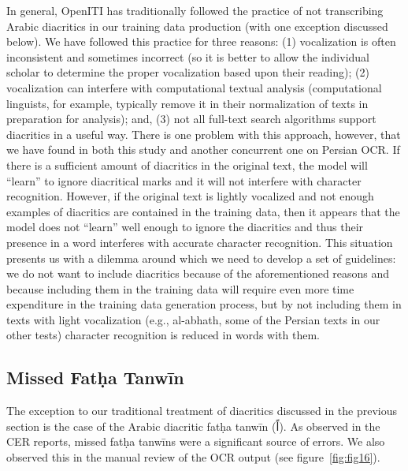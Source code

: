 In general, OpenITI has traditionally followed the practice of not transcribing
Arabic diacritics in our training data production (with one exception discussed
below). We have followed this practice for three reasons: (1) vocalization is
often inconsistent and sometimes incorrect (so it is better to allow the
individual scholar to determine the proper vocalization based upon their
reading); (2) vocalization can interfere with computational textual analysis
(computational linguists, for example, typically remove it in their
normalization of texts in preparation for analysis); and, (3) not all full-text
search algorithms support diacritics in a useful way. There is one problem with
this approach, however, that we have found in both this study and another
concurrent one on Persian OCR. If there is a sufficient amount of diacritics in
the original text, the model will “learn” to ignore diacritical marks and it
will not interfere with character recognition. However, if the original text is
lightly vocalized and not enough examples of diacritics are contained in the
training data, then it appears that the model does not “learn” well enough to
ignore the diacritics and thus their presence in a word interferes with
accurate character recognition. This situation presents us with a dilemma
around which we need to develop a set of guidelines: we do not want to include
diacritics because of the aforementioned reasons and because including them in
the training data will require even more time expenditure in the training data
generation process, but by not including them in texts with light vocalization
(e.g., al-abhath, some of the Persian texts in our other tests) character
recognition is reduced in words with them. 

\subsection{Missed Fatḥa Tanwīn}

The exception to our traditional treatment of diacritics discussed in the
previous section is the case of the Arabic diacritic fatḥa tanwīn (اً). As
observed in the CER reports, missed fatḥa tanwīns were a significant source of
errors. We also observed this in the manual review of the OCR output (see
figure~\ref{fig:fig16}).

